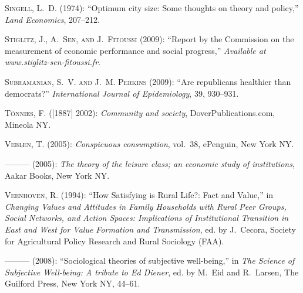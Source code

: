 \documentclass[12pt, letterpaper]{article}
\begin{document}
\begin{spacing}{1.9}
\begin{thebibliography}{77}
\textsc{Singell, L.~D.} (1974): \enquote{Optimum city size: Some thoughts on
  theory and policy,} \emph{Land Economics}, 207--212.

\textsc{Stiglitz, J., A.~Sen, and J.~Fitoussi} (2009): \enquote{Report by the
  Commission on the measurement of economic performance and social progress,}
  \emph{Available at www.stiglitz-sen-fitoussi.fr}.

\textsc{Subramanian, S.~V. and J.~M. Perkins} (2009): \enquote{Are republicans
  healthier than democrats?} \emph{International Journal of Epidemiology}, 39,
  930--931.

\textsc{T{\"o}nnies, F.} ([1887] 2002): \emph{Community and society},
  DoverPublications.com, Mineola NY.

\textsc{Veblen, T.} (2005{}): \emph{Conspicuous consumption},
  vol.~38, ePenguin, New York NY.

---\hspace{-.1pt}---\hspace{-.1pt}--- (2005{}): \emph{The theory of
  the leisure class; an economic study of institutions}, Aakar Books, New York
  NY.

\textsc{Veenhoven, R.} (1994): \enquote{How Satisfying is Rural Life?: Fact and
  Value,} in \emph{Changing Values and Attitudes in Family Households with
  Rural Peer Groups, Social Networks, and Action Spaces: Implications of
  Institutional Transition in East and West for Value Formation and
  Transmission}, ed. by J.~Cecora, Society for Agricultural Policy Research and
  Rural Sociology (FAA).

---\hspace{-.1pt}---\hspace{-.1pt}--- (2008): \enquote{Sociological theories of
  subjective well-being,} in \emph{The Science of Subjective Well-being: A
  tribute to Ed Diener}, ed. by M.~Eid and R.~Larsen, The Guilford Press, New
  York NY, 44--61.


\end{thebibliography}
\end{spacing}
\end{document}
